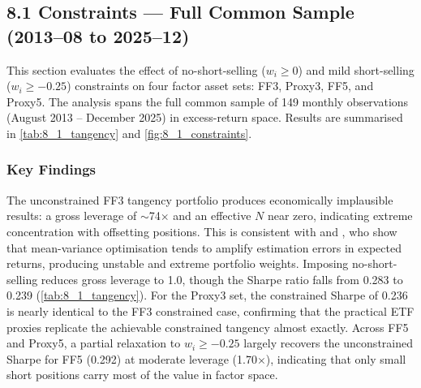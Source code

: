 \documentclass[11pt]{exam}
\begin{document}
\subsection{8.1 Constraints --- Full Common Sample (2013--08 to 2025--12)}

\noindent This section evaluates the effect of no-short-selling ($w_i \geq 0$) and mild short-selling ($w_i \geq -0.25$) constraints on four factor asset sets: FF3, Proxy3, FF5, and Proxy5. The analysis spans the full common sample of 149 monthly observations (August 2013 -- December 2025) in excess-return space. Results are summarised in \autoref{tab:8_1_tangency} and \autoref{fig:8_1_constraints}.

\subsubsection*{Key Findings}

\noindent The unconstrained FF3 tangency portfolio produces economically implausible results: a gross leverage of $\sim$74$\times$ and an effective $N$ near zero, indicating extreme concentration with offsetting positions. This is consistent with \cite{Michaud1989} and \cite{green1992}, who show that mean-variance optimisation tends to amplify estimation errors in expected returns, producing unstable and extreme portfolio weights. Imposing no-short-selling reduces gross leverage to 1.0, though the Sharpe ratio falls from 0.283 to 0.239 (\autoref{tab:8_1_tangency}). For the Proxy3 set, the constrained Sharpe of 0.236 is nearly identical to the FF3 constrained case, confirming that the practical ETF proxies replicate the achievable constrained tangency almost exactly. Across FF5 and Proxy5, a partial relaxation to $w_i \geq -0.25$ largely recovers the unconstrained Sharpe for FF5 (0.292) at moderate leverage (1.70$\times$), indicating that only small short positions carry most of the value in factor space.
\end{document}
